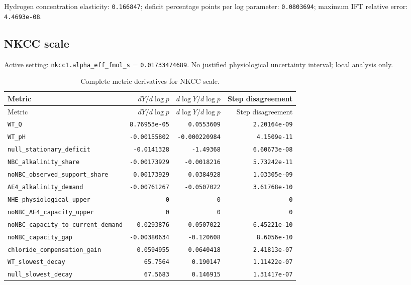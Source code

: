Hydrogen concentration elasticity: \texttt{0.166847}; deficit percentage points per log parameter: \texttt{0.0803694}; maximum IFT relative error: \texttt{4.4693e-08}.\par

\subsection*{NKCC scale}
Active setting: \nolinkurl{nkcc1.alpha_eff_fmol_s} = \texttt{0.01733474689}. No justified physiological uncertainty interval; local analysis only.


\begingroup\scriptsize
\setlength{\tabcolsep}{3pt}
\begin{longtable}{p{.44\linewidth}rrr}
\caption{Complete metric derivatives for NKCC scale.}\\
\toprule
Metric & $dY/d\log p$ & $d\log Y/d\log p$ & Step disagreement \\
\midrule\endfirsthead
\toprule
Metric & $dY/d\log p$ & $d\log Y/d\log p$ & Step disagreement \\
\midrule\endhead
\bottomrule\endfoot
\nolinkurl{WT_Q} & \texttt{8.76953e-05} & \texttt{0.0553609} & \texttt{2.20164e-09} \\
\nolinkurl{WT_pH} & \texttt{-0.00155802} & \texttt{-0.000220984} & \texttt{4.1509e-11} \\
\nolinkurl{null_stationary_deficit} & \texttt{-0.0141328} & \texttt{-1.49368} & \texttt{6.60673e-08} \\
\nolinkurl{NBC_alkalinity_share} & \texttt{-0.00173929} & \texttt{-0.0018216} & \texttt{5.73242e-11} \\
\nolinkurl{noNBC_observed_support_share} & \texttt{0.00173929} & \texttt{0.0384928} & \texttt{1.03305e-09} \\
\nolinkurl{AE4_alkalinity_demand} & \texttt{-0.00761267} & \texttt{-0.0507022} & \texttt{3.61768e-10} \\
\nolinkurl{NHE_physiological_upper} & \texttt{0} & \texttt{0} & \texttt{0} \\
\nolinkurl{noNBC_AE4_capacity_upper} & \texttt{0} & \texttt{0} & \texttt{0} \\
\nolinkurl{noNBC_capacity_to_current_demand} & \texttt{0.0293876} & \texttt{0.0507022} & \texttt{6.45221e-10} \\
\nolinkurl{noNBC_capacity_gap} & \texttt{-0.00380634} & \texttt{-0.120608} & \texttt{8.6056e-10} \\
\nolinkurl{chloride_compensation_gain} & \texttt{0.0594955} & \texttt{0.0640418} & \texttt{2.41813e-07} \\
\nolinkurl{WT_slowest_decay} & \texttt{65.7564} & \texttt{0.190147} & \texttt{1.11422e-07} \\
\nolinkurl{null_slowest_decay} & \texttt{67.5683} & \texttt{0.146915} & \texttt{1.31417e-07} \\
\end{longtable}
\endgroup

